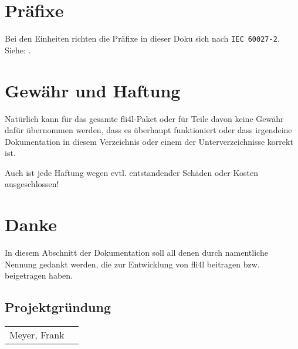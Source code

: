     \section{Präfixe}

    Bei den Einheiten richten die Präfixe in dieser Doku sich nach \verb+IEC 60027-2+.\\
    Siehe: .

    \section{Gewähr und Haftung}

    Natürlich kann für das gesamte fli4l-Paket oder für Teile
    davon keine Gewähr dafür übernommen werden, dass es überhaupt
    funktioniert oder dass irgendeine Dokumentation in diesem
    Verzeichnis oder einem der Unterverzeichnisse korrekt ist.
    
    Auch ist jede Haftung wegen evtl. entstandender Schäden oder 
    Kosten ausgeschlossen!

    \section{Danke}
    \newcommand{\membermail}[3]{\multicolumn{2}{l}{#1 (\emph{#2})}\\\nopagebreak & \email{#3}\\}
    \newcommand{\member}[2]{#1 (\emph{#2})\\}
    \newcommand{\personmail}[2]{#1 & \email{#2}\\}
    \newcommand{\person}[1]{#1\\}
    
    In diesem Abschnitt der Dokumentation soll all denen durch namentliche Nennung
    gedankt werden, die zur Entwicklung von fli4l beitragen bzw. beigetragen haben.

    \subsection{Projektgründung}
    
    \begin{tabular}{ll}
      \person{Meyer, Frank}
    \end{tabular}\latex{\\}

    \noindent{}
  
